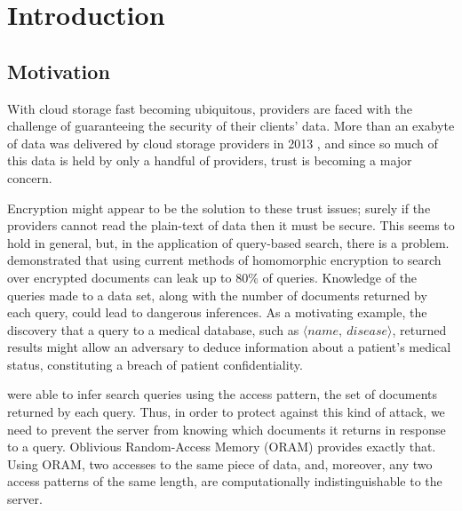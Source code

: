 \documentclass[12pt,a4paper,twoside,openright]{report}
\begin{document}
\bigskip
{}

\medskip
{}

\tableofcontents

\listoffigures



\pagestyle{headings}

\chapter{Introduction}

\section{Motivation}

With cloud storage fast becoming ubiquitous, providers are faced with the challenge of guaranteeing the security of their clients' data. More than an exabyte of data was delivered by cloud storage providers in 2013 \cite{nasuni2013cloud}, and since so much of this data is held by only a handful of providers, trust is becoming a major concern.

Encryption might appear to be the solution to these trust issues; surely if the providers cannot read the plain-text of data then it must be secure. This seems to hold in general, but, in the application of query-based search, there is a problem. \citet{islam2012access} demonstrated that using current methods of homomorphic encryption to search over encrypted documents can leak up to 80\% of queries. Knowledge of the queries made to a data set, along with the number of documents returned by each query, could lead to dangerous inferences. As a motivating example, the discovery that a query to a medical database, such as $\langle name,~disease\rangle$, returned results might allow an adversary to deduce information about a patient's medical status, constituting a breach of patient confidentiality.

\citet{islam2012access} were able to infer search queries using the access pattern, the set of documents returned by each query. Thus, in order to protect against this kind of attack, we need to prevent the server from knowing which documents it returns in response to a query. Oblivious Random-Access Memory (ORAM) provides exactly that. Using ORAM, two accesses to the same piece of data, and, moreover, any two access patterns of the same length, are computationally indistinguishable to the server.
\end{document}
